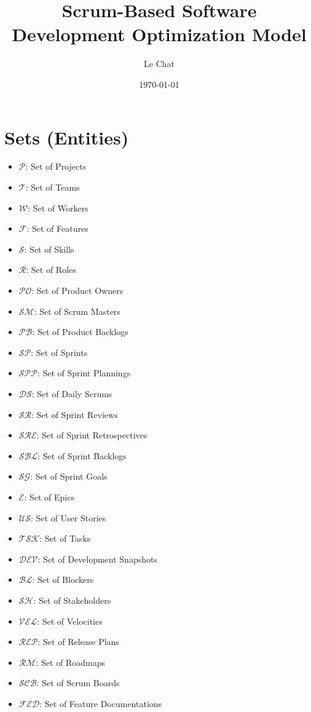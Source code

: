 \documentclass{article}
\title{Scrum-Based Software Development Optimization Model}
\author{Le Chat}
\date{\today}
\begin{document}
\maketitle
\tableofcontents

\section{Sets (Entities)}
\begin{itemize}
    \item $\mathcal{P}$: Set of Projects
    \item $\mathcal{T}$: Set of Teams
    \item $\mathcal{W}$: Set of Workers
    \item $\mathcal{F}$: Set of Features
    \item $\mathcal{S}$: Set of Skills
    \item $\mathcal{R}$: Set of Roles
    \item $\mathcal{PO}$: Set of Product Owners
    \item $\mathcal{SM}$: Set of Scrum Masters
    \item $\mathcal{PB}$: Set of Product Backlogs
    \item $\mathcal{SP}$: Set of Sprints
    \item $\mathcal{SPP}$: Set of Sprint Plannings
    \item $\mathcal{DS}$: Set of Daily Scrums
    \item $\mathcal{SR}$: Set of Sprint Reviews
    \item $\mathcal{SRE}$: Set of Sprint Retrospectives
    \item $\mathcal{SBL}$: Set of Sprint Backlogs
    \item $\mathcal{SG}$: Set of Sprint Goals
    \item $\mathcal{E}$: Set of Epics
    \item $\mathcal{US}$: Set of User Stories
    \item $\mathcal{TSK}$: Set of Tasks
    \item $\mathcal{DEV}$: Set of Development Snapshots
    \item $\mathcal{BL}$: Set of Blockers
    \item $\mathcal{SH}$: Set of Stakeholders
    \item $\mathcal{VEL}$: Set of Velocities
    \item $\mathcal{REP}$: Set of Release Plans
    \item $\mathcal{RM}$: Set of Roadmaps
    \item $\mathcal{SCB}$: Set of Scrum Boards
    \item $\mathcal{FED}$: Set of Feature Documentations
\end{itemize}
\end{document}
